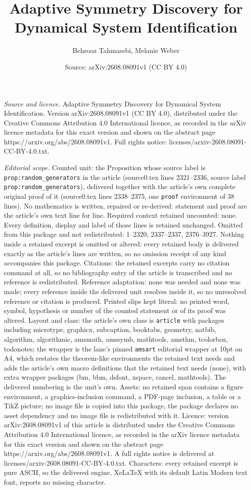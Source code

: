 \documentclass[10pt,a4paper]{amsart}
\title[Adaptive Symmetry Discovery for Dynamical System Identificat]{Adaptive Symmetry Discovery for Dynamical System Identification}
\author{Behrooz Tahmasebi, Melanie Weber}
\date{Source: arXiv:2608.08091v1 (CC BY 4.0)}
\begin{document}
\maketitle

\noindent\emph{Source and licence.} Adaptive Symmetry Discovery for Dynamical System Identification. Version arXiv:2608.08091v1 (CC BY 4.0), distributed under the Creative Commons Attribution 4.0 International licence, as recorded in the arXiv licence metadata for this exact version and shown on the abstract page https://arxiv.org/abs/2608.08091v1. Full rights notice: licenses/arxiv-2608.08091-CC-BY-4.0.txt.\par\smallskip

\noindent\textit{Editorial scope.} Counted unit: the Proposition whose source label is \texttt{prop:random\_generators} in the article (source0.tex lines 2321--2336, source label \texttt{prop:random\_generators}), delivered together with the article's own complete original proof of it (source0.tex lines 2338--2375, one \texttt{proof} environment of 38 lines). No mathematics is written, repaired or re-derived: statement and proof are the article's own text line for line. Required context retained uncounted: none. Every definition, display and label of those lines is retained unchanged. Omitted from this package and not redistributed: 1--2320, 2337--2337, 2376--3927. Nothing inside a retained excerpt is omitted or altered: every retained body is delivered exactly as the article's lines are written, so no omission receipt of any kind accompanies this package. Citations: the retained excerpts carry no citation command at all, so no bibliography entry of the article is transcribed and no reference is redistributed. Reference adaptation: none was needed and none was made; every reference inside the delivered unit resolves inside it, so no unresolved reference or citation is produced. Printed slips kept literal: no printed word, symbol, hypothesis or number of the counted statement or of its proof was altered. Layout and class: the article's own class is \texttt{article} with packages including microtype, graphicx, subcaption, booktabs, geometry, natbib, algorithm, algorithmic, amsmath, amssymb, mathtools, amsthm, tcolorbox, todonotes; the wrapper is the lane's pinned \texttt{amsart} editorial wrapper at 10pt on A4, which restates the theorem-like environments the retained text needs and adds the article's own macro definitions that the retained text needs (none), with extra wrapper packages (bm, bbm, dsfont, xspace, cancel, mathtools). The delivered numbering is the unit's own. Assets: no retained span contains a figure environment, a graphics-inclusion command, a PDF-page inclusion, a table or a TikZ picture; no image file is copied into this package, the package declares no asset dependency and no image file is redistributed with it. Licence: version arXiv:2608.08091v1 of this article is distributed under the Creative Commons Attribution 4.0 International licence, as recorded in the arXiv licence metadata for this exact version and shown on the abstract page https://arxiv.org/abs/2608.08091v1. A full rights notice is delivered at licenses/arxiv-2608.08091-CC-BY-4.0.txt. Characters: every retained excerpt is pure ASCII, so the delivered engine, XeLaTeX with its default Latin Modern text font, reports no missing character.
\end{document}
